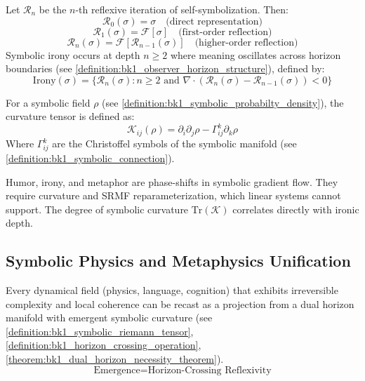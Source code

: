 \begin{definition}
\label{definition:bk1_reflexive_encoding_depth}
Let $\mathcal{R}_n$ be the $n$-th reflexive iteration of self-symbolization. Then:
\[
\mathcal{R}_0(\sigma) = \sigma \quad \text{(direct representation)}
\]
\[
\mathcal{R}_1(\sigma) = \mathcal{F}[\sigma] \quad \text{(first-order reflection)}
\]
\[
\mathcal{R}_n(\sigma) = \mathcal{F}[\mathcal{R}_{n-1}(\sigma)] \quad \text{(higher-order reflection)}
\]
Symbolic irony occurs at depth $n \geq 2$ where meaning oscillates across horizon boundaries (see \ref{definition:bk1_observer_horizon_structure}), defined by:
\[
\text{Irony}(\sigma) = \{\mathcal{R}_n(\sigma) : n \geq 2 \text{ and } \nabla \cdot (\mathcal{R}_n(\sigma) - \mathcal{R}_{n-1}(\sigma)) < 0\}
\]
\end{definition}

\begin{definition}
\label{definition:bk1_symbolic_field_curvature_tensor}
For a symbolic field $\rho$ (see \ref{definition:bk1_symbolic_probabilty_density}), the curvature tensor is defined as:
\[
\mathcal{K}_{ij}(\rho) = \partial_i \partial_j \rho - \Gamma^k_{ij} \partial_k \rho
\]
Where $\Gamma^k_{ij}$ are the Christoffel symbols of the symbolic manifold (see \ref{definition:bk1_symbolic_connection}).
\end{definition}

\begin{remark}
Humor, irony, and metaphor are phase-shifts in symbolic gradient flow. They require curvature and SRMF reparameterization, which linear systems cannot support. The degree of symbolic curvature $\text{Tr}(\mathcal{K})$ correlates directly with ironic depth.
\end{remark}
\subsection{Symbolic Physics and Metaphysics Unification}
\label{subsec:bk1_symbolic_physics_and_metaphysics_unification}

\begin{theorem}
\label{theorem:bk1_dual_horizon_unification_principle}
Every dynamical field (physics, language, cognition) that exhibits irreversible complexity and local coherence can be recast as a projection from a dual horizon manifold with emergent symbolic curvature (see \ref{definition:bk1_symbolic_riemann_tensor}, \ref{definition:bk1_horizon_crossing_operation}, \ref{theorem:bk1_dual_horizon_necessity_theorem}).
\[
\text{Emergence} = \text{Horizon-Crossing Reflexivity}
\]
\end{theorem}

